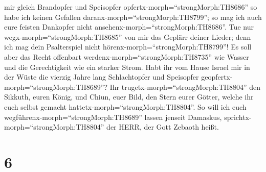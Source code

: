 mir gleich Brandopfer und Speisopfer
opfertx-morph=``strongMorph:TH8686'' so habe ich keinen Gefallen
daranx-morph=``strongMorph:TH8799''; so mag ich auch eure feisten
Dankopfer nicht ansehenx-morph=``strongMorph:TH8686''.  Tue
nur wegx-morph=``strongMorph:TH8685'' von mir das Geplärr deiner Lieder;
denn ich mag dein Psalterspiel nicht
hörenx-morph=``strongMorph:TH8799''!  Es soll aber das
Recht offenbart werdenx-morph=``strongMorph:TH8735'' wie Wasser und die
Gerechtigkeit wie ein starker Strom.  Habt ihr vom Hause
Israel mir in der Wüste die vierzig Jahre lang Schlachtopfer und
Speisopfer geopfertx-morph=``strongMorph:TH8689''?  Ihr
trugetx-morph=``strongMorph:TH8804'' den Sikkuth, euren König, und
Chiun, euer Bild, den Stern eurer Götter, welche ihr euch selbst gemacht
hattetx-morph=``strongMorph:TH8804''.  So will ich euch
wegführenx-morph=``strongMorph:TH8689'' lassen jenseit Damaskus,
sprichtx-morph=``strongMorph:TH8804'' der HERR, der Gott Zebaoth heißt.

\hypertarget{section-5}{%
\section{6}\label{section-5}}

